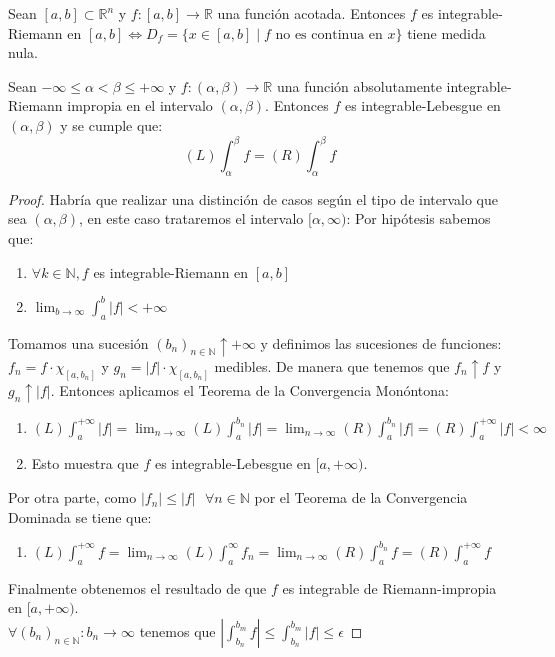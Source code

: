 \begin{teorema}
    Sean $[a, b]\subset \mathbb{R}^n$ y $f: [a, b] \to \mathbb{R}$ una función acotada. Entonces $f$ es integrable-Riemann en $[a, b] \iff D_f = \{ x \in [a, b] \mid f \text{ no es continua en } x \}$ tiene medida nula.
\end{teorema}
\begin{teorema}
    Sean $-\infty \leq \alpha < \beta \leq +\infty$ y $f: (\alpha, \beta) \to \mathbb{R}$ una función absolutamente integrable-Riemann impropia en el intervalo $(\alpha, \beta)$. Entonces $f$ es integrable-Lebesgue en $(\alpha, \beta)$ y se cumple que:
    $$ (L) \int_{\alpha}^{\beta}f = (R)\int_{\alpha}^{\beta}f $$
\end{teorema}
\begin{proof}
    Habría que realizar una distinción de casos según el tipo de intervalo que sea $(\alpha, \beta)$, en este caso trataremos el intervalo $[\alpha, \infty)$: 
    Por hipótesis sabemos que: 
    \begin{enumerate}
        \item $\forall k \in \mathbb{N}, f$ es integrable-Riemann en $[a, b]$
        \item $\lim_{b \to \infty} \int_{a}^{b}|f| < +\infty$
    \end{enumerate}
    Tomamos una sucesión $(b_n)_{n \in \mathbb{N}} \uparrow +\infty$ y definimos las sucesiones de funciones: $f_n = f\cdot\chi_{[a, b_n]}$ y $g_n = |f|\cdot\chi_{[a, b_n]}$ medibles. De manera que tenemos que $f_n \uparrow f$ y $g_n \uparrow |f|$. Entonces aplicamos el Teorema de la Convergencia Monóntona: 
    \begin{enumerate}
        \item $(L)\int_{a}^{+\infty}|f| = \lim_{n \to \infty}(L)\int_{a}^{b_n}|f| = \lim_{n \to \infty}(R)\int_{a}^{b_n}|f| = (R)\int_{a}^{+\infty}|f| < \infty$
        \item Esto muestra que $f$ es integrable-Lebesgue en $[a, +\infty)$. 
    \end{enumerate}
    Por otra parte, como $|f_n| \leq |f| \text{  }\forall n \in \mathbb{N}$ por el Teorema de la Convergencia Dominada se tiene que:
    \begin{enumerate}
        \item $(L)\int_{a}^{+\infty}f = \lim_{n \to \infty}(L)\int_{a}^{\infty}f_n = \lim_{n \to \infty}(R)\int_{a}^{b_n}f = (R)\int_{a}^{+\infty}f$
    \end{enumerate}
    Finalmente obtenemos el resultado de que $f$ es integrable de Riemann-impropia en $[a, +\infty)$.
    \\$\forall (b_n)_{n \in \mathbb{N}} : b_n \to \infty$ tenemos que $|\int_{b_n}^{b_m}f| \leq \int_{b_n}^{b_m}|f| \leq \epsilon$
\end{proof}

